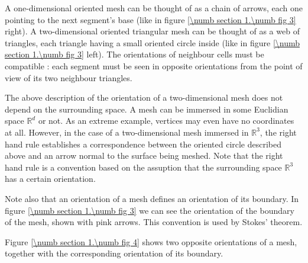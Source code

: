A one-dimensional oriented mesh can be thought of as a chain of arrows,
each one pointing to the next segment's base (like in figure \ref{\numb section 1.\numb fig 3}
right).
A two-dimensional oriented triangular mesh can be thought of as a web of triangles,
each triangle having a small oriented circle inside (like in figure
\ref{\numb section 1.\numb fig 3} left).
The orientations of neighbour cells must be compatible : each segment must be seen
in opposite orientations from the point of view of its two neighbour triangles.

The above description of the orientation of a two-dimensional mesh does not depend
on the surrounding space.
A mesh can be immersed in some Euclidian space $ \mathbb{R}^d $ or not.
As an extreme example, vertices may even have no coordinates at all.
However, in the case of a two-dimensional mesh immersed in $ \mathbb{R}^3 $,
the right hand rule establishes a correspondence between the oriented circle described above
and an arrow normal to the surface being meshed.
Note that the right hand rule is a convention based on the assuption that
the surrounding space $ \mathbb{R}^3 $ has a certain orientation.

Note also that an orientation of a mesh defines an orientation of its boundary.
In figure \ref{\numb section 1.\numb fig 3} we can see the orientation of the
boundary of the mesh, shown with pink arrows.
This convention is used by Stokes' theorem.

Figure \ref{\numb section 1.\numb fig 4} shows two opposite orientations of a mesh,
together with the corresponding orientation of its boundary.

